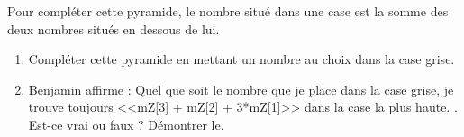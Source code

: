 \exon{}

\begin{minipage}{0.4\linewidth}
	\begin{center}
\end{center}
\end{minipage}
\begin{minipage}{0.6\linewidth}
Pour compléter cette pyramide, le nombre situé dans une case est la somme des deux nombres situés en dessous de lui.

\begin{enumerate}
	\item Compléter cette pyramide en mettant un nombre au choix dans la case grise.
	\item Benjamin affirme : \og{} Quel que soit le nombre que je place dans la case grise, je trouve toujours <<mZ[3] + mZ[2] + 3*mZ[1]>> dans la case la plus haute. \fg{}. Est-ce vrai ou faux ? Démontrer le.
\end{enumerate}
\end{minipage}


